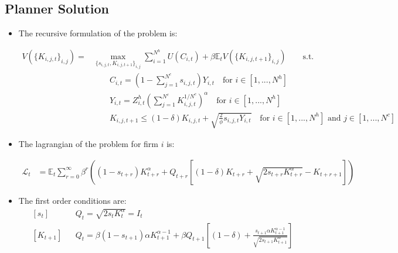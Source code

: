 \documentclass[11pt]{article}
\newcommand{\E}{\mathbb{E}}
\numberwithin{equation}{section}
\begin{document}
\subsection{Planner Solution}

\begin{itemize}
	
	\item The recursive formulation of the problem is:
	
	
	\begin{align*}
	V\left(\{K_{i,j,t}\}_{i,j}\right) = &\max_{\{s_{i,j,t},K_{i,j,t+1}\}_{i,j}} \sum_{i=1}^{N^h} U(C_{i,t}) + \beta \E_t V(\{K_{i,j,t+1}\}_{i,j}) \qquad \text{s.t.}\\
	&\qquad
	C_{i,t} = (1-\sum_{j=1}^{N^c} s_{i,j,t})Y_{i,t} \quad \text{for } i \in [1,...,N^h]\\
	&\qquad
	Y_{i,t}=Z^h_{i,t} \left(\sum_{j=1}^{N^c} K_{i,j,t}^{1/N^c} \right)^{\alpha}  \quad \text{for } i \in [1,...,N^h]\\
	&\qquad
	K_{i,j,t+1} \leq (1-\delta) K_{i,j,t} + \sqrt{\frac{2}{\phi} s_{i,j,t} Y_{i,t}}  \quad \text{for } i \in [1,...,N^h] \text{ and } j \in [1,...,N^c]
	\end{align*}
	
	
	\item The lagrangian of the problem for firm $i$ is:
	
	\begin{align*}
	\mathcal{L}_{t} &= \E_t \sum_{r=0}^{\infty}\beta^r \left( (1-s_{t+r}) K_{t+r}^\alpha  +   Q_{t+r} \left[(1-\delta) K_{t+r} + \sqrt{2 s_{t+r} K^\alpha_{t+r}}-K_{t+r+1}\right]\right)
	\end{align*}
	
	\item The first order conditions are:
	\begin{align}
	& \left[s_{t}\right] && Q_t = \sqrt{2s_t K^\alpha_t} = I_t \\
	& \left[K_{t+1}\right] && Q_t =\beta (1-s_{t+1}) \alpha K^{\alpha-1}_{t+1} + \beta Q_{t+1} \left[(1-\delta) + \frac{s_{t+1} \alpha K_{t+1}^{\alpha-1}}{\sqrt{2 s_{t+1} K^\alpha_{t+1}}} \right]  
	\end{align}
	
%	

\end{itemize}
\end{document}
